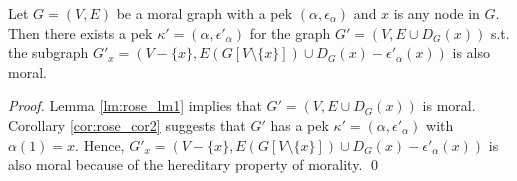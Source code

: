 \begin{corollary}
\label{cor:rose_cor1}
Let $G=(V,E)$ be a moral graph with a pek $(\alpha, \epsilon_{\alpha})$ and $x$ is any node in $G$. Then there exists a pek $\kappa'=(\alpha,\epsilon'_{\alpha})$ for the graph $G'=(V,E\cup D_G(x))$ s.t. the subgraph $G'_x = (V-\{x\},E(G[V\setminus \{x\}])\cup D_G(x)-\epsilon'_{\alpha}(x))$ is also moral. 
\end{corollary}
\begin{proof}
Lemma \ref{lm:rose_lm1} implies that $G'=(V,E\cup D_G(x))$ is moral. Corollary \ref{cor:rose_cor2} suggests that $G'$ has a pek $\kappa'=(\alpha,\epsilon'_{\alpha})$ with $\alpha(1)=x$. Hence, $G'_x = (V-\{x\},E(G[V\setminus \{x\}])\cup D_G(x)-\epsilon'_{\alpha}(x))$ is also moral because of the hereditary property of morality. \qed
\end{proof}

